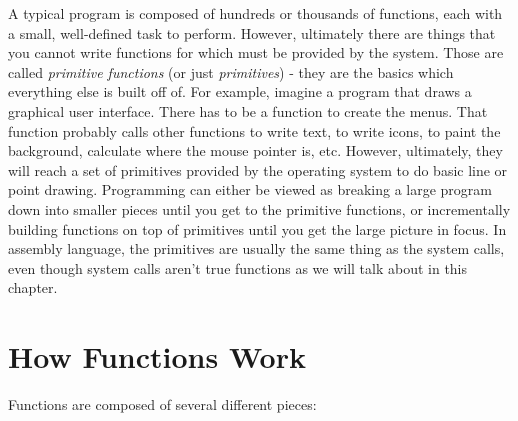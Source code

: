 A typical program is composed of hundreds or thousands of functions, each with a 
small, well-defined task to perform.  However, ultimately there are things
that you cannot write functions for which must be provided by the system.
Those are called \emph{primitive functions} (or just \emph{primitives}) - they are the
basics which everything else is built off of.  For example, imagine a program
that draws a graphical user interface.  There has to be a function to create
the menus.  That function probably calls other functions to write text, to
write icons, to paint the background, calculate where the mouse pointer is,
etc.  However, ultimately, they will
reach a set of primitives provided by the operating system to do basic line
or point drawing.  Programming can either be viewed as breaking a large
program down into smaller pieces until you get to the primitive functions,
or incrementally building functions on top of primitives until you get the large picture
in focus.  In assembly language, the primitives are usually the same thing
as the system calls,
even though system calls aren't true functions as we will talk about in this chapter.

\section{How Functions Work}
\label{howfunctionswork}

Functions are composed of several different pieces:

